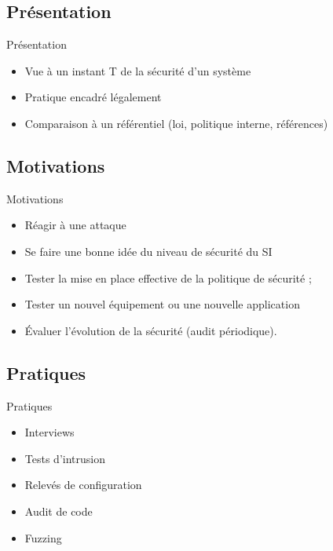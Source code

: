 \documentclass{beamer}
\begin{document}
	\subsection{Présentation}
	\begin{frame}{Présentation}
		\begin{itemize}
			\item Vue à un instant T de la sécurité d'un système
			\item Pratique encadré légalement
			\item Comparaison à un référentiel (loi, politique interne, références)
		\end{itemize}
	\end{frame}
	\subsection{Motivations}
	\begin{frame}{Motivations}
		\begin{itemize}
			\item Réagir à une attaque
			\item Se faire une bonne idée du niveau de sécurité du SI
			\item Tester la mise en place effective de la politique de sécurité ;
			\item Tester un nouvel équipement ou une nouvelle application
			\item Évaluer l'évolution de la sécurité (audit périodique).
		\end{itemize}
	\end{frame}
	\subsection{Pratiques}
	\begin{frame}{Pratiques}
		\begin{itemize}
			\item Interviews
			\item Tests d'intrusion
			\item Relevés de configuration
			\item Audit de code
			\item Fuzzing
		\end{itemize}
	\end{frame}
\end{document}
